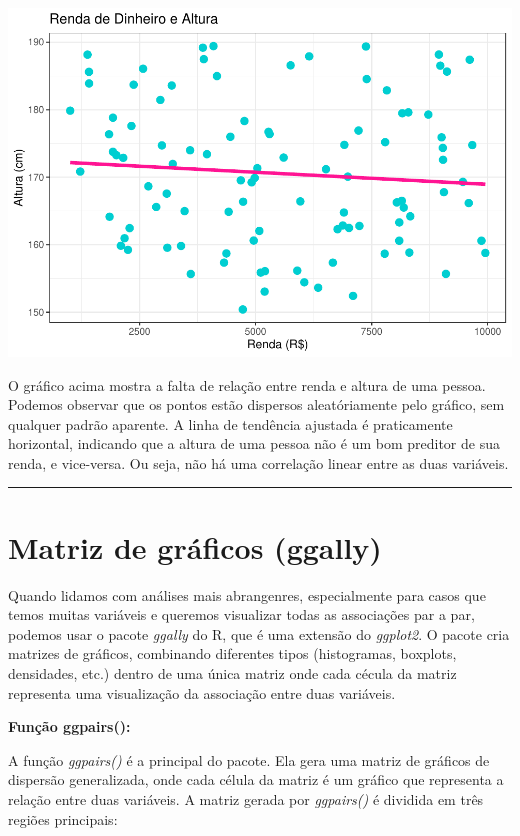 \documentclass[
]{book}
\begin{document}
\begin{center}\includegraphics{AED_files/figure-latex/graf_dispersao3-1} \end{center}

O gráfico acima mostra a falta de relação entre renda e altura de uma pessoa. Podemos observar que os pontos estão dispersos aleatóriamente pelo gráfico, sem qualquer padrão aparente. A linha de tendência ajustada é praticamente horizontal, indicando que a altura de uma pessoa não é um bom preditor de sua renda, e vice-versa. Ou seja, não há uma correlação linear entre as duas variáveis.

\begin{center}\rule{0.5\linewidth}{0.5pt}\end{center}

\section{Matriz de gráficos (ggally)}\label{matriz-de-gruxe1ficos-ggally}

Quando lidamos com análises mais abrangenres, especialmente para casos que temos muitas variáveis e queremos visualizar todas as associações par a par, podemos usar o pacote \emph{ggally} do R, que é uma extensão do \emph{ggplot2}. O pacote cria matrizes de gráficos, combinando diferentes tipos (histogramas, boxplots, densidades, etc.) dentro de uma única matriz onde cada cécula da matriz representa uma visualização da associação entre duas variáveis.

\textbf{Função ggpairs():}

A função \emph{ggpairs()} é a principal do pacote. Ela gera uma matriz de gráficos de dispersão generalizada, onde cada célula da matriz é um gráfico que representa a relação entre duas variáveis. A matriz gerada por \emph{ggpairs()} é dividida em três regiões principais:
\end{document}
